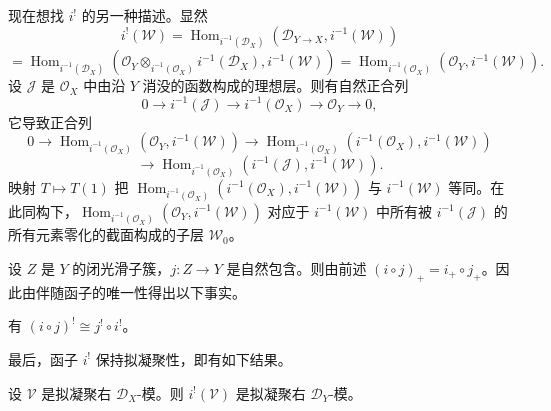 现在想找 $i^!$ 的另一种描述。显然
$$i^!(\mathcal{W})=\operatorname{Hom}_{i^{-1}(\mathcal{D}_X)}(\mathcal{D}_{Y\to X},i^{-1}(\mathcal{W}))$$
$$=\operatorname{Hom}_{i^{-1}(\mathcal{D}_X)}(\mathcal{O}_Y\otimes_{i^{-1}(\mathcal{O}_X)}i^{-1}(\mathcal{D}_X),i^{-1}(\mathcal{W}))
=\operatorname{Hom}_{i^{-1}(\mathcal{O}_X)}(\mathcal{O}_Y,i^{-1}(\mathcal{W})).$$
设 $\mathcal{J}$ 是 $\mathcal{O}_X$ 中由沿 $Y$ 消没的函数构成的理想层。则有自然正合列
$$0\longrightarrow i^{-1}(\mathcal{J})\longrightarrow i^{-1}(\mathcal{O}_X)\longrightarrow\mathcal{O}_Y\longrightarrow0,$$
它导致正合列
$$0\longrightarrow\operatorname{Hom}_{i^{-1}(\mathcal{O}_X)}(\mathcal{O}_Y,i^{-1}(\mathcal{W}))
\longrightarrow\operatorname{Hom}_{i^{-1}(\mathcal{O}_X)}(i^{-1}(\mathcal{O}_X),i^{-1}(\mathcal{W}))$$
$$\longrightarrow\operatorname{Hom}_{i^{-1}(\mathcal{O}_X)}(i^{-1}(\mathcal{J}),i^{-1}(\mathcal{W})).$$
映射 $T\mapsto T(1)$ 把 $\operatorname{Hom}_{i^{-1}(\mathcal{O}_X)}(i^{-1}(\mathcal{O}_X),i^{-1}(\mathcal{W}))$ 与
$i^{-1}(\mathcal{W})$ 等同。在此同构下，$\operatorname{Hom}_{i^{-1}(\mathcal{O}_X)}(\mathcal{O}_Y,i^{-1}(\mathcal{W}))$ 对应于 $i^{-1}(\mathcal{W})$ 中所有被 $i^{-1}(\mathcal{J})$ 的所有元素零化的截面构成的子层 $\mathcal{W}_0$。

设 $Z$ 是 $Y$ 的闭光滑子簇，$j:Z\to Y$ 是自然包含。则由前述 $(i\circ j)_+=i_+\circ j_+$。因此由伴随函子的唯一性得出以下事实。

\begin{lemma}\label{lem:4.8.2}
有 $(i\circ j)^!\cong j^!\circ i^!$。
\end{lemma}

最后，函子 $i^!$ 保持拟凝聚性，即有如下结果。

\begin{proposition}\label{prop:4.8.3}
设 $\mathcal{V}$ 是拟凝聚右 $\mathcal{D}_X$-模。则 $i^!(\mathcal{V})$ 是拟凝聚右 $\mathcal{D}_Y$-模。
\end{proposition}

